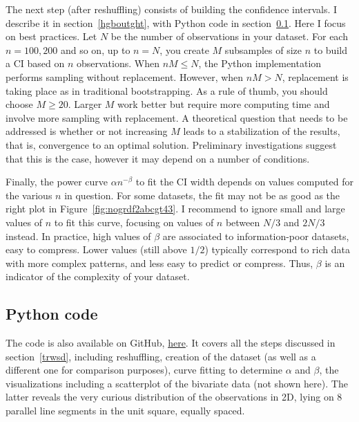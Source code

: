 \documentclass[oneside,10pt]{book}
\begin{document}
The next step (after reshuffling) consists of building the confidence intervals. I describe it in section~\ref{hgboutght},
 with Python code in section~\ref{joyofpython}. Here I focus on best practices. Let $N$ be the number of observations in your dataset.
 For each $n=100, 200$ and so on, up to $n = N$, you create $M$ subsamples of size $n$ to build a CI based on $n$ observations.
When $nM \leq N$, the Python implementation performs sampling without replacement. However, when $nM > N$, replacement is taking place as in traditional \textcolor{index}{bootstrapping}. As a rule of thumb, you should choose $M\geq 20$.
 Larger $M$ work better but require more computing time and involve more sampling with replacement. A theoretical question that needs to be addressed is whether or not increasing $M$ leads to a stabilization of the results, that is, convergence to an optimal solution.
 Preliminary investigations suggest that this is the case, however it may depend on a number of conditions.

Finally, the power curve $\alpha n^{-\beta}$ to fit the CI width depends on values computed for the various $n$ in question. For some datasets, the fit may not be as good as the right plot in Figure~\ref{fig:nogrdf2abcgt43}. I recommend to ignore small and large values of $n$ to fit this curve, focusing on values of $n$ between $N/3$ and $2N/3$ instead. In practice, high values of $\beta$
 are associated to information-poor datasets, easy to compress. Lower values (still above $1/2$) typically correspond to rich data
 with more complex patterns, and less easy to predict or compress. Thus, $\beta$ is an indicator of the complexity of your dataset.



\subsection{Python code}\label{joyofpython}


The code is also available on GitHub, \href{https://github.com/VincentGranville/Statistical-Optimization/blob/main/confidenceIntervals.py}{here}. It covers all the steps discussed in section~\ref{trwsd}, including reshuffling, creation of the dataset (as well as a different one for comparison purposes),
 curve fitting to determine $\alpha$ and $\beta$, the visualizations including a scatterplot of the
 bivariate data (not shown here). The latter reveals the very curious distribution of the observations in 2D, lying on 8 parallel line segments in the unit square, equally spaced. \vspace{1ex}
\end{document}
